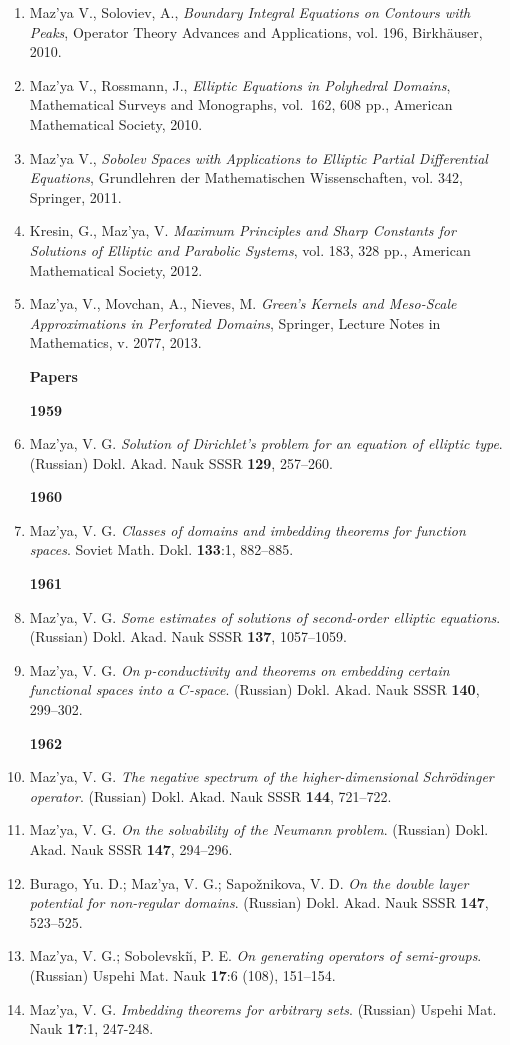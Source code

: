 \documentclass{article}
\begin{document}
\begin{enumerate}
\item Maz'ya V.,  Soloviev, A., {\it Boundary Integral Equations on Contours with Peaks}, Operator Theory Advances and Applications, vol. 196, Birkh\"auser, 2010.

\item Maz'ya V., Rossmann, J., {\it Elliptic Equations in Polyhedral Domains},      Mathematical Surveys and
       Monographs, vol.~162, 608 pp., American Mathematical Society,
2010.

\item Maz'ya V., {\it Sobolev Spaces with Applications to Elliptic Partial Differential Equations}, Grundlehren der Mathematischen Wissenschaften, vol. 342, Springer, 2011.

\item Kresin, G., Maz'ya, V. {\it Maximum Principles and Sharp Constants for Solutions of Elliptic and Parabolic Systems}, vol. 183, 328 pp., American Mathematical Society,
2012.

\item  Maz'ya, V.,  Movchan, A.,   Nieves, M.  
{\it Green's Kernels and Meso-Scale Approximations in Perforated Domains}, Springer, Lecture Notes in Mathematics,  v. 2077, 2013.

\vfill\eject
\textbf{\Large Papers}

\vspace{1em}
{\bf 1959}
\item Maz'ya, V. G. {\it Solution of Dirichlet's problem for an
equation
of elliptic type}. (Russian) Dokl. Akad.
Nauk SSSR {\bf 129}, 257--260.\hfill\break

{\bf 1960}
\item Maz'ya, V. G. {\it Classes of domains and imbedding theorems for
function spaces}. Soviet Math. Dokl. {\bf 133}:1,
882--885.\hfill\break

{\bf 1961}
\item Maz'ya, V. G. {\it Some estimates of solutions of second-order
elliptic equations}. (Russian) Dokl. Akad. Nauk
SSSR {\bf 137}, 1057--1059.
\item Maz'ya, V. G. {\it On $p$-conductivity and theorems on embedding
certain functional spaces into a $C$-space}.
(Russian) Dokl. Akad. Nauk SSSR {\bf 140}, 299--302.\hfill\break

{\bf 1962}
\item Maz'ya, V. G. {\it The negative spectrum of the
higher-dimensional
Schr\"odinger operator}. (Russian) Dokl. Akad. Nauk
SSSR {\bf 144}, 721--722.
\item Maz'ya, V. G. {\it On the solvability of the Neumann problem}.
(Russian) Dokl. Akad. Nauk SSSR {\bf 147},
294--296.
\item Burago, Yu. D.; Maz'ya, V. G.; Sapo\v znikova, V. D. {\it On the
double layer potential  for non-regular
domains}. (Russian) Dokl. Akad. Nauk SSSR {\bf 147}, 523--525.
\item Maz'ya, V. G.; Sobolevski{\u\i}, P. E. {\it On generating
operators
of semi-groups}. (Russian) Uspehi Mat.
Nauk {\bf 17}:6 (108), 151--154.
\item Maz'ya, V. G. {\it Imbedding theorems for arbitrary sets}.
(Russian)
Uspehi Mat. Nauk {\bf 17}:1, 247-248.\hfill\break


\end{enumerate}
\end{document}
